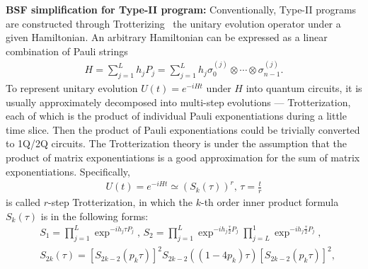 \textbf{BSF simplification for Type-II program:} Conventionally, Type-II programs are constructed through Trotterizing~\cite{dalzell2023quantum} the unitary evolution operator under a given Hamiltonian. An arbitrary Hamiltonian can be expressed as a linear combination of Pauli strings
\begin{align}
    H = \sum_{j=1}^L h_j P_j = \sum_{j=1}^L h_j \sigma_0^{(j)} \otimes \cdots \otimes \sigma_{n-1}^{(j)}.
\end{align}
To represent unitary evolution $U(t) = e^{-iHt}$ under $H$ into quantum circuits, it is usually approximately decomposed into multi-step evolutions --- Trotterization, each of which is the product of individual Pauli exponentiations during a little time slice. Then the product of Pauli exponentiations could be trivially converted to 1Q/2Q circuits. The Trotterization theory is under the assumption that the product of matrix exponentiations is a good approximation for the sum of matrix exponentiations. Specifically, 
\begin{align}
    U(t) = e^{-iHt} \simeq  \left( S_{k}\left(\tau\right) \right)^r,\, \tau = \frac{t}{r}
\end{align}
is called $r$-step Trotterization, in which the $k$-th order inner product formula $S_k(\tau)$ is in the following forms:
\begin{align*}
    &S_1 = \prod_{j=1}^{L} \exp^{ -i h_j \tau P_j},\,
    S_2 = \prod_{j=1}^{L} \exp^{ -i h_j \frac{\tau}{2} P_j}\prod_{j=L}^1 \exp^{ -i h_j \frac{\tau}{2} P_j},\\
    &S_{2k}(\tau) = [S_{2k-2}(p_k\tau)]^2S_{2k-2}\left( (1-4p_k)\tau\right)[S_{2k-2}(p_k\tau)]^2,
\end{align*}
